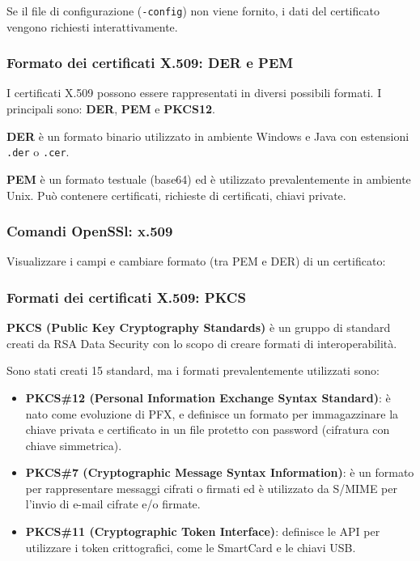             Se il file di configurazione (\verb|-config|) non viene fornito, i dati del certificato vengono richiesti interattivamente.

            

        \subsubsection{Formato dei certificati X.509: DER e PEM}
            I certificati X.509 possono essere rappresentati in diversi possibili formati. I principali sono: \textbf{DER}, \textbf{PEM} e \textbf{PKCS12}.
        
            \textbf{DER} è un formato binario utilizzato in ambiente Windows e Java con estensioni \verb|.der| o \verb|.cer|.
        
            \textbf{PEM} è un formato testuale (base64) ed è utilizzato prevalentemente in ambiente Unix. Può contenere certificati, richieste di certificati, chiavi private.

        \subsubsection{Comandi OpenSSl: x.509}
            Visualizzare i campi e cambiare formato (tra PEM e DER) di un certificato:

            

        \subsubsection{Formati dei certificati X.509: PKCS}
            \textbf{PKCS (Public Key Cryptography Standards)} è un gruppo di standard creati da RSA Data Security con lo scopo di creare formati di interoperabilità.

            Sono stati creati 15 standard, ma i formati prevalentemente utilizzati sono:
            \begin{itemize}
                \item \textbf{PKCS\#12 (Personal Information Exchange Syntax Standard)}: è nato come evoluzione di PFX, e definisce un formato per immagazzinare la chiave privata e certificato in un file protetto con password (cifratura con chiave simmetrica).
                \item \textbf{PKCS\#7 (Cryptographic Message Syntax Information)}: è un formato per rappresentare messaggi cifrati o firmati ed è utilizzato da S/MIME per l'invio di e-mail cifrate e/o firmate.
                \item \textbf{PKCS\#11 (Cryptographic Token Interface)}: definisce le API per utilizzare i token crittografici, come le SmartCard e le chiavi USB.
            \end{itemize}

